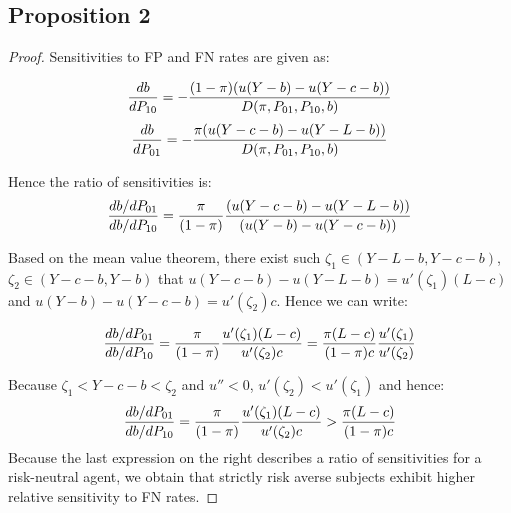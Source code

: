 \documentclass[12pt,a4paper]{article}
\begin{document}
\begin{appendices}


\subsection{Proposition 2}

\begin{proof}


Sensitivities to FP and FN rates are given as:

\begin{equation}
	{db\over dP_{10}}=-{(1-\pi)(u(Y-b)-u(Y-c-b))\over D(\pi, P_{01}, P_{10}, b)}
\end{equation}
\begin{equation}
	{db\over dP_{01}}=-{\pi(u(Y-c-b)-u(Y-L-b))\over D(\pi, P_{01}, P_{10}, b)}
\end{equation}


Hence the ratio of sensitivities is:
\begin{equation}
{db / dP_{01}  \over db / dP_{10}} = {\pi \over (1-\pi)} {(u(Y-c-b)-u(Y-L-b))\over (u(Y-b)-u(Y-c-b))}
\end{equation}


Based on the mean value theorem, there exist such $\zeta_1 \in (Y-L-b, Y-c-b)$, $\zeta_2\in (Y-c-b,Y-b)$ that $u(Y-c-b)-u(Y-L-b)=u'(\zeta_1)(L-c)$ and $u(Y-b)-u(Y-c-b)=u'(\zeta_2)c$. Hence we can write:

\begin{equation}
{db / dP_{01}  \over db / dP_{10}} = {\pi \over (1-\pi)} {u'(\zeta_1)(L-c)\over u'(\zeta_2)c}= {\pi (L-c)\over (1-\pi)c}{u'(\zeta_1)\over u'(\zeta_2)}
\end{equation}

Because $\zeta_1<Y-c-b<\zeta_2$ and $u''<0$, $u'(\zeta_2)<u'(\zeta_1)$ and hence:
\begin{equation}
{db / dP_{01}  \over db / dP_{10}} = {\pi \over (1-\pi)} {u'(\zeta_1)(L-c)\over u'(\zeta_2)c}>{\pi (L-c)\over (1-\pi)c}
\end{equation}
Because the last expression on the right describes a ratio of sensitivities for a risk-neutral agent, we obtain that strictly risk averse subjects exhibit higher relative sensitivity to FN rates. 


\end{proof}
\end{appendices}
\end{document}
